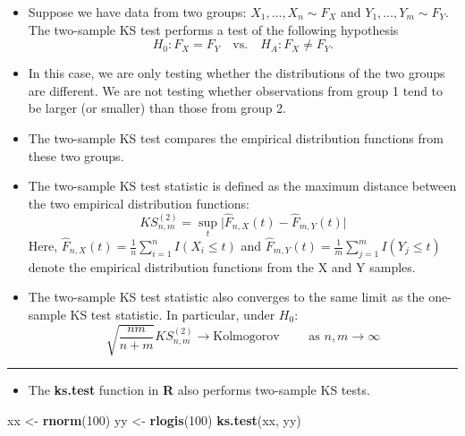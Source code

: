 \documentclass[]{book}
\newenvironment{Shaded}{\begin{snugshade}}{\end{snugshade}}
\newcommand{\DecValTok}[1]{\textcolor[rgb]{0.00,0.00,0.81}{#1}}
\newcommand{\KeywordTok}[1]{\textcolor[rgb]{0.13,0.29,0.53}{\textbf{#1}}}
\newcommand{\NormalTok}[1]{#1}
\newcommand{\StringTok}[1]{\textcolor[rgb]{0.31,0.60,0.02}{#1}}
\providecommand{\tightlist}{%
  \setlength{\itemsep}{0pt}\setlength{\parskip}{0pt}}
\begin{document}
\begin{itemize}
\item
  Suppose we have data from two groups: \(X_{1}, \ldots, X_{n} \sim F_{X}\) and \(Y_{1}, \ldots, Y_{m} \sim F_{Y}\).
  The two-sample KS test performs a test of the following hypothesis
  \begin{equation}
  H_{0}: F_{X} = F_{Y} \quad \textrm{vs.} \quad H_{A}: F_{X} \neq F_{Y}. \nonumber
  \end{equation}
\item
  In this case, we are only testing whether the distributions of the two groups are different.
  We are not testing whether observations from group 1 tend to be larger (or smaller)
  than those from group 2.
\item
  The two-sample KS test compares the empirical distribution functions from these
  two groups.
\item
  The two-sample KS test statistic is defined as the maximum distance between the
  two empirical distribution functions:
  \begin{equation}
  KS_{n,m}^{(2)} = \sup_{t} \big| \hat{F}_{n,X}(t) - \hat{F}_{m,Y}(t)  \big|  \nonumber
  \end{equation}
  Here, \(\hat{F}_{n,X}(t) = \frac{1}{n}\sum_{i=1}^{n} I(X_{i} \leq t)\) and
  \(\hat{F}_{m,Y}(t) = \frac{1}{m}\sum_{j=1}^{m} I(Y_{j} \leq t)\) denote
  the empirical distribution functions from the X and Y samples.
\item
  The two-sample KS test statistic also converges to the same limit as
  the one-sample KS test statistic. In particular, under \(H_{0}\):
  \begin{equation}
  \sqrt{ \frac{nm}{n + m } }KS_{n,m}^{(2)} \longrightarrow \textrm{Kolmogorov}
  \qquad \textrm{ as } n,m \longrightarrow \infty  \nonumber
  \end{equation}
\end{itemize}

\begin{center}\rule{0.5\linewidth}{\linethickness}\end{center}

\begin{itemize}
\tightlist
\item
  The \textbf{ks.test} function in \textbf{R} also performs two-sample KS tests.
\end{itemize}

\begin{Shaded}
\begin{Highlighting}[]
\NormalTok{xx <-}\StringTok{ }\KeywordTok{rnorm}\NormalTok{(}\DecValTok{100}\NormalTok{)}
\NormalTok{yy <-}\StringTok{ }\KeywordTok{rlogis}\NormalTok{(}\DecValTok{100}\NormalTok{)}
\KeywordTok{ks.test}\NormalTok{(xx, yy)  }
\end{Highlighting}
\end{Shaded}
\end{document}
